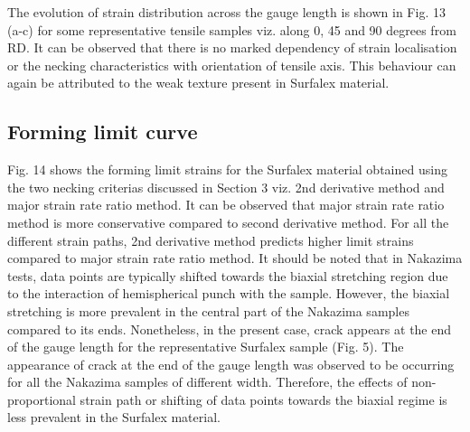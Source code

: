 \documentclass[11pt]{article} %
\begin{document}
The evolution of strain distribution across the gauge length is shown in Fig. 13 (a-c) for some representative tensile samples viz. along 0, 45 and 90 degrees from RD. It can be observed that there is no marked dependency of strain localisation or the necking characteristics with orientation of tensile axis. This behaviour can again be attributed to the weak texture present in Surfalex material. 

\subsection{Forming limit curve}
Fig. 14 shows the forming limit strains for the Surfalex material obtained using the two necking criterias discussed in Section 3 viz. 2nd derivative method and major strain rate ratio method. It can be observed that major strain rate ratio method is more conservative compared to second derivative method. For all the different strain paths, 2nd derivative method predicts higher limit strains compared to major strain rate ratio method. It should be noted that in Nakazima tests, data points are typically shifted towards the biaxial stretching region due to the interaction of hemispherical punch with the sample. However, the biaxial stretching is more prevalent in the central part of the Nakazima samples compared to its ends. Nonetheless, in the present case, crack appears at the end of the gauge length for the representative Surfalex sample (Fig. 5). The appearance of crack at the end of the gauge length was observed to be occurring for all the Nakazima samples of different width. Therefore, the effects of non-proportional strain path or shifting of data points towards the biaxial regime is less prevalent in the Surfalex material. 






\end{document}
